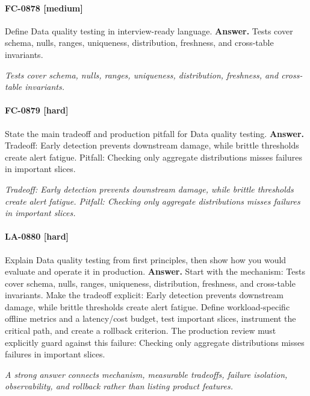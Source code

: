 \paragraph{FC-0878 [medium]} Define Data quality testing in interview-ready language.
\noindent\textbf{Answer.} Tests cover schema, nulls, ranges, uniqueness, distribution, freshness, and cross-table invariants.
\par\textit{Tests cover schema, nulls, ranges, uniqueness, distribution, freshness, and cross-table invariants.}
\paragraph{FC-0879 [hard]} State the main tradeoff and production pitfall for Data quality testing.
\noindent\textbf{Answer.} Tradeoff: Early detection prevents downstream damage, while brittle thresholds create alert fatigue. Pitfall: Checking only aggregate distributions misses failures in important slices.
\par\textit{Tradeoff: Early detection prevents downstream damage, while brittle thresholds create alert fatigue. Pitfall: Checking only aggregate distributions misses failures in important slices.}
\paragraph{LA-0880 [hard]} Explain Data quality testing from first principles, then show how you would evaluate and operate it in production.
\noindent\textbf{Answer.} Start with the mechanism: Tests cover schema, nulls, ranges, uniqueness, distribution, freshness, and cross-table invariants. Make the tradeoff explicit: Early detection prevents downstream damage, while brittle thresholds create alert fatigue. Define workload-specific offline metrics and a latency/cost budget, test important slices, instrument the critical path, and create a rollback criterion. The production review must explicitly guard against this failure: Checking only aggregate distributions misses failures in important slices.
\par\textit{A strong answer connects mechanism, measurable tradeoffs, failure isolation, observability, and rollback rather than listing product features.}
